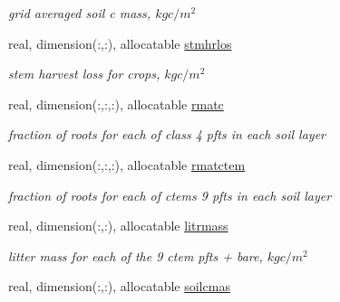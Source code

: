 \begin{DoxyCompactItemize}
\begin{DoxyCompactList}\small\item\em grid averaged soil c mass, $kg c/m^2$ \end{DoxyCompactList}\item 
\hypertarget{structctem__statevars_1_1veg__gat_af5fb179faddbf6c47296ae0873adbe47}{}real, dimension(\+:,\+:), allocatable \hyperlink{structctem__statevars_1_1veg__gat_af5fb179faddbf6c47296ae0873adbe47}{stmhrlos}\label{structctem__statevars_1_1veg__gat_af5fb179faddbf6c47296ae0873adbe47}

\begin{DoxyCompactList}\small\item\em stem harvest loss for crops, $kg c/m^2$ \end{DoxyCompactList}\item 
\hypertarget{structctem__statevars_1_1veg__gat_a315761d1d6eb5e503ae8d602eab82bcd}{}real, dimension(\+:,\+:,\+:), allocatable \hyperlink{structctem__statevars_1_1veg__gat_a315761d1d6eb5e503ae8d602eab82bcd}{rmatc}\label{structctem__statevars_1_1veg__gat_a315761d1d6eb5e503ae8d602eab82bcd}

\begin{DoxyCompactList}\small\item\em fraction of roots for each of class\textquotesingle{} 4 pfts in each soil layer \end{DoxyCompactList}\item 
\hypertarget{structctem__statevars_1_1veg__gat_a8dbc92d60413fae1d6cc5ebd9d86cecb}{}real, dimension(\+:,\+:,\+:), allocatable \hyperlink{structctem__statevars_1_1veg__gat_a8dbc92d60413fae1d6cc5ebd9d86cecb}{rmatctem}\label{structctem__statevars_1_1veg__gat_a8dbc92d60413fae1d6cc5ebd9d86cecb}

\begin{DoxyCompactList}\small\item\em fraction of roots for each of ctem\textquotesingle{}s 9 pfts in each soil layer \end{DoxyCompactList}\item 
\hypertarget{structctem__statevars_1_1veg__gat_af72a4bf240784fd713cbfca356a75678}{}real, dimension(\+:,\+:), allocatable \hyperlink{structctem__statevars_1_1veg__gat_af72a4bf240784fd713cbfca356a75678}{litrmass}\label{structctem__statevars_1_1veg__gat_af72a4bf240784fd713cbfca356a75678}

\begin{DoxyCompactList}\small\item\em litter mass for each of the 9 ctem pfts + bare, $kg c/m^2$ \end{DoxyCompactList}\item 
\hypertarget{structctem__statevars_1_1veg__gat_acaa6becbd5fb7f590ff9cda9f43baa12}{}real, dimension(\+:,\+:), allocatable \hyperlink{structctem__statevars_1_1veg__gat_acaa6becbd5fb7f590ff9cda9f43baa12}{soilcmas}\label{structctem__statevars_1_1veg__gat_acaa6becbd5fb7f590ff9cda9f43baa12}


\end{DoxyCompactItemize}
